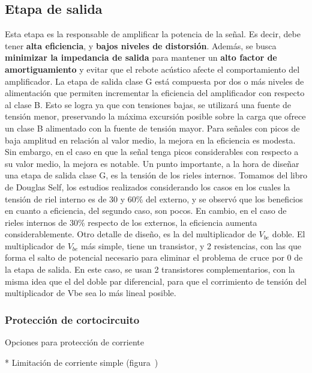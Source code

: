 \subsection{Etapa de salida}
Esta etapa es la responsable de amplificar la potencia de la señal. Es decir, debe tener \textbf{alta eficiencia}, y \textbf{bajos niveles de distorsión}. Además, se busca \textbf{minimizar la impedancia de salida} para mantener un \textbf{alto factor de amortiguamiento} y evitar que el rebote acústico afecte el comportamiento del amplificador. 
La etapa de salida clase G está compuesta por dos o más niveles de alimentación que permiten incrementar la eficiencia del amplificador con respecto al clase B. Esto se logra ya que con tensiones bajas, se utilizará una fuente de tensión menor, preservando la máxima excursión posible sobre la carga que ofrece un clase B alimentado con la fuente de tensión mayor. Para señales con picos de baja amplitud en relación al valor medio, la mejora en la eficiencia es modesta. Sin embargo, en el caso en que la señal tenga picos considerables con respecto a su valor medio, la mejora es notable. Un punto importante, a la hora de diseñar una etapa de salida clase G, es la tensión de los rieles internos. Tomamos del libro de Douglas Self, los estudios realizados considerando los casos en los cuales la tensión de riel interno es de 30 y 60\% del externo, y se observó que los beneficios en cuanto a eficiencia, del segundo caso, son pocos. En cambio, en el caso de rieles internos de 30\% respecto de los externos, la eficiencia aumenta considerablemente. Otro detalle de diseño, es la del multiplicador de $V_{be}$ doble. El multiplicador de $V_{be}$ más simple, tiene un transistor, y 2 resistencias, con las que forma el salto de potencial necesario para eliminar el problema de cruce por 0 de la etapa de salida. En este caso, se usan 2 transistores complementarios, con la misma idea que el del doble par diferencial, para que el corrimiento de tensión del multiplicador de Vbe sea lo más lineal posible.

\subsubsection{Protección de cortocircuito}


Opciones para protección de corriente

* Limitación de corriente simple (figura~)

